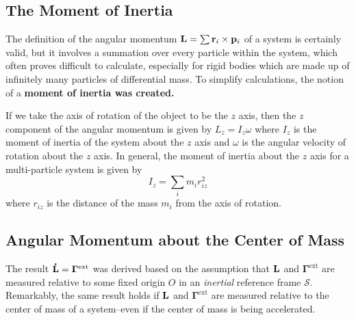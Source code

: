 \subsection*{The Moment of Inertia}
The definition of the angular momentum $\mathbf{L} = \sum \mathbf{r}_i \times \mathbf{p}_i$ of a system is certainly valid, but it involves a summation over every particle within the system, which often proves difficult to calculate, especially for rigid bodies which are made up of infinitely many particles of differential mass. To simplify calculations, the notion of a \bf{moment of inertia} was created.

If we take the axis of rotation of the object to be the $z$ axis, then the $z$ component of the angular momentum is given by $L_z = I_z\omega$ where $I_z$ is the moment of inertia of the system about the $z$ axis and $\omega$ is the angular velocity of rotation about the $z$ axis. In general, the moment of inertia about the $z$ axis for a multi-particle system is given by 
\[ I_z = \sum_i m_i r_{iz}^2 \]
where $r_{iz}$ is the distance of the mass $m_i$ from the axis of rotation. 
\subsection*{Angular Momentum about the Center of Mass}
The result $\mathbf{\dot L}=\bm{\Gamma}^\text{ext}$ was derived based on the assumption that $\mathbf{L}$ and $\bm{\Gamma}^\text{ext}$ are measured relative to some fixed origin $O$ in an \textit{inertial} reference frame $\mathcal{S}$. Remarkably, the same result holds if $\mathbf{L}$ and $\bm{\Gamma}^\text{ext}$ are measured relative to the center of mass of a system--even if the center of mass is being accelerated.

